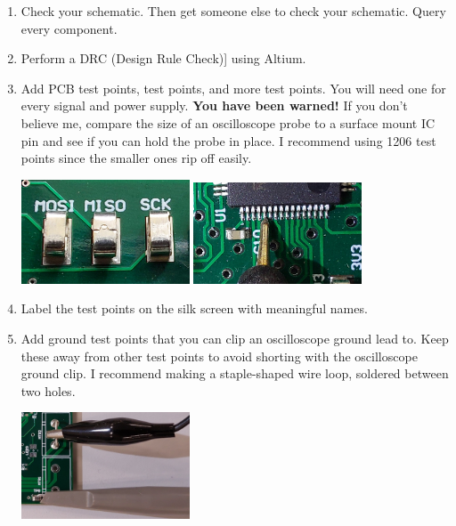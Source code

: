\begin{enumerate}
\item Check your schematic.  Then get someone else to check your
  schematic.  Query every component.

\item Perform a DRC (Design Rule Check)] using Altium.

\item Add PCB test points, test points, and more test points.  You
  will need one for every signal and power supply.  \textbf{You have
    been warned!}  If you don't believe me, compare the size of an
  oscilloscope probe to a surface mount IC pin and see if you can hold
  the probe in place.  I recommend using 1206 test points since the
  smaller ones rip off easily.

  \includegraphics[width=5cm]{../guide/figs/testpoints.jpg}  \includegraphics[width=5cm]{../guide/figs/micro_probe_zoom.jpg}

\item Label the test points on the silk screen with meaningful names.

\item Add ground test points that you can clip an oscilloscope ground
  lead to.  Keep these away from other test points to avoid shorting
  with the oscilloscope ground clip.  I recommend making a
  staple-shaped wire loop, soldered between two holes.

\includegraphics[width=5cm]{figs/scope_probe_testpoints.jpg}


\end{enumerate}
